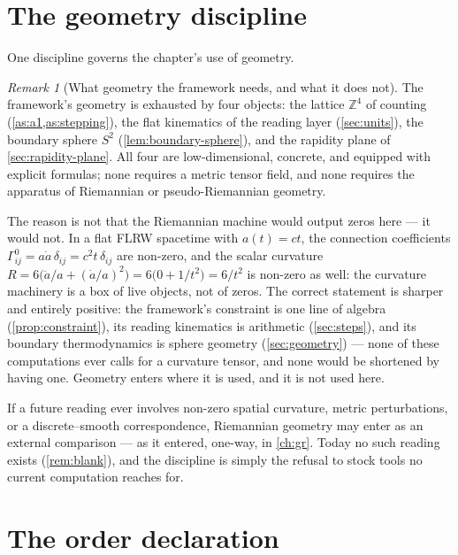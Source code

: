 \documentclass[11pt]{amsbook}
\theoremstyle{plain}
\theoremstyle{definition}
\theoremstyle{remark}
\newtheorem{remark}[theorem]{Remark}
\begin{document}
\section{The geometry discipline}\label{sec:geometry-discipline}

One discipline governs the chapter's use of geometry.

\begin{remark}[What geometry the framework needs, and what it does not]\label{rem:geometry-discipline}
The framework's geometry is exhausted by four objects: the lattice $\mathbb{Z}^{4}$ of counting (\cref{as:a1,as:stepping}), the flat kinematics of the reading layer (\cref{sec:units}), the boundary sphere $S^{2}$ (\cref{lem:boundary-sphere}), and the rapidity plane of \cref{sec:rapidity-plane}. All four are low-dimensional, concrete, and equipped with explicit formulas; none requires a metric tensor field, and none requires the apparatus of Riemannian or pseudo-Riemannian geometry.

The reason is not that the Riemannian machine would output zeros here --- it would not. In a flat FLRW spacetime with $a(t) = ct$, the connection coefficients $\Gamma^{0}_{ij} = a\dot a\,\delta_{ij} = c^{2}t\,\delta_{ij}$ are non-zero, and the scalar curvature $R = 6\bigl(\ddot a/a + (\dot a/a)^{2}\bigr) = 6\bigl(0 + 1/t^{2}\bigr) = 6/t^{2}$ is non-zero as well: the curvature machinery is a box of live objects, not of zeros. The correct statement is sharper and entirely positive: the framework's constraint is one line of algebra (\cref{prop:constraint}), its reading kinematics is arithmetic (\cref{sec:steps}), and its boundary thermodynamics is sphere geometry (\cref{sec:geometry}) --- none of these computations ever calls for a curvature tensor, and none would be shortened by having one. Geometry enters where it is used, and it is not used here.

If a future reading ever involves non-zero spatial curvature, metric perturbations, or a discrete--smooth correspondence, Riemannian geometry may enter as an external comparison --- as it entered, one-way, in \cref{ch:gr}. Today no such reading exists (\cref{rem:blank}), and the discipline is simply the refusal to stock tools no current computation reaches for.
\end{remark}

\section{The order declaration}\label{sec:order-declaration}
\end{document}
